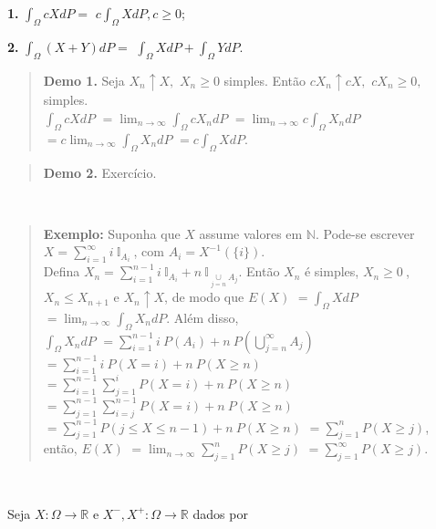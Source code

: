 \documentclass[
]{book}
\begin{document}
\textbf{1.} \(\displaystyle\int_\Omega cXdP =\) \(c\displaystyle\int_\Omega XdP, c\geq 0\);

\textbf{2.} \(\displaystyle\int_\Omega (X+Y)dP =\) \(\displaystyle\int_\Omega XdP + \int_\Omega YdP\).

\begin{quote}
\textbf{Demo 1.} Seja \(X_n\uparrow X,\) \(X_n \geq 0\) simples. Então \(cX_n\uparrow cX,\) \(cX_n \geq 0,\) simples.\\
\(\displaystyle\int_\Omega cX dP\) \(=\displaystyle\lim_{n\rightarrow\infty}\int_\Omega cX_n dP\) \(=\displaystyle\lim_{n\rightarrow\infty}c\int_\Omega X_n dP\) \(=\displaystyle c\lim_{n\rightarrow\infty}\int_\Omega X_n dP\) \(=\displaystyle c\int_\Omega X dP\).
\end{quote}

\begin{quote}
\textbf{Demo 2.} Exercício.
\end{quote}

\(~\)

\begin{quote}
\textbf{Exemplo:} Suponha que \(X\) assume valores em \(\mathbb{N}\). Pode-se escrever \(X =\displaystyle\sum_{i=1}^\infty i ~\mathbb{I}_{A_i}~\), com \(A_i = X^{-1}\left(\{i\}\right)\).\\
Defina \(X_n =\displaystyle\sum_{i=1}^{n-1} i ~\mathbb{I}_{A_i}+n~\mathbb{I}_{\underset{j=n}{\cup} A_j}\). Então \(X_n\) é simples, \(X_n \geq 0~\), \(X_n \leq X_{n+1}\) e \(X_n \uparrow X\), de modo que \(E(X)\) \(=\displaystyle\int_\Omega X dP\) \(=\displaystyle\lim_{n \rightarrow\infty}\int_\Omega X_n dP\). Além disso,\\
\(\displaystyle\int_\Omega X_n dP\) \(=\displaystyle\sum_{i=1}^{n-1} i~P(A_i) + n~P\left(\bigcup_{j=n}^{\infty} A_j\right)\) \(=\displaystyle\sum_{i=1}^{n-1}i~P(X = i) + n~P(X \geq n)\) \(=\displaystyle\sum_{i=1}^{n-1} \sum_{j=1}^{i} P(X = i) + n~P(X \geq n)\) \(\displaystyle=\sum_{j=1}^{n-1} \sum_{i=j}^{n-1} P(X = i) + n~P(X \geq n)\) \(=\displaystyle\sum_{j=1}^{n-1}P(j \leq X \leq n-1) + n~P(X \geq n)\) \(=\displaystyle\sum_{j=1}^n P(X \geq j)\),\\
então, \(E(X)\) \(\displaystyle=\lim_{n\rightarrow \infty}\sum_{j=1}^nP(X \geq j)\) \(\displaystyle=\sum_{j=1}^{\infty}P(X \geq j)\).
\end{quote}

\(~\)

Seja \(X: \Omega \longrightarrow \mathbb{R}\) e \(X^-,X^+: \Omega \longrightarrow \mathbb{R}\) dados por
\end{document}
